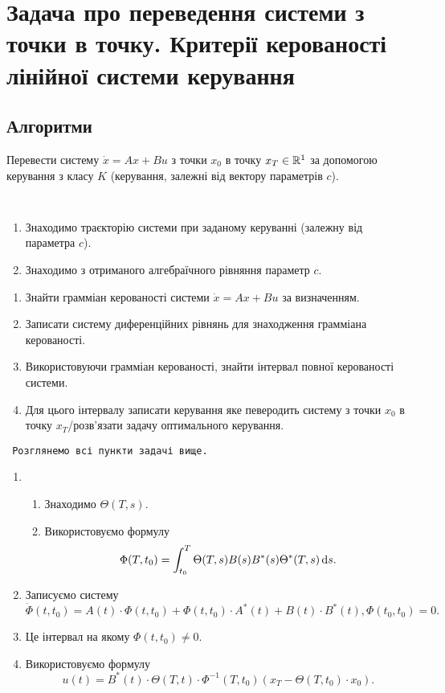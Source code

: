 \section{Задача про переведення системи з точки в точку. Критерії керованості лінійної системи керування}

\subsection{Алгоритми}

\begin{problem*}
	Перевести систему $\dot x = A x + B u$ з точки $x_0$ в точку $x_T \in \mathbb{R}^1$ за допомогою керування з класу $K$ (керування, залежні від вектору параметрів $c$).
\end{problem*}

\begin{algorithm} \tt
	\begin{enumerate}
		\item Знаходимо траєкторію системи при заданому керуванні (залежну від параметра $c$). 
		\item Знаходимо з отриманого алгебраїчного рівняння параметр $c$.
	\end{enumerate}
\end{algorithm}

\begin{problem*}
	\begin{enumerate}
		\item Знайти грамміан керованості системи $\dot x = A x + B u$ за визначенням.
		\item Записати систему диференційних рівнянь для знаходження грамміана керованості.
		\item Використовуючи грамміан керованості, знайти інтервал повної керованості системи.
		\item Для цього інтервалу записати керування яке певеродить систему з точки $x_0$ в точку $x_T$/розв'язати задачу оптимального керування.
	\end{enumerate}
\end{problem*}

\begin{algorithm} \tt
	Розглянемо всі пункти задачі вище.
	\begin{enumerate}
		\item \begin{enumerate}
			\item Знаходимо $\Theta(T,s)$.
			\item Використовуємо формулу \[\Phi(T, t_0) = \int_{t_0}^T \Theta(T, s) B(s) B^*(s) \Theta^*(T, s) \mathop{}\!\mathrm{d} s.\]
		\end{enumerate}
		\item Записуємо систему \[ \dot \Phi(t, t_0) = A(t) \cdot \Phi(t,t_0)+\Phi(t,t_0)\cdot A^*(t)+B(t)\cdot B^*(t), \Phi(t_0,t_0) = 0. \]
		\item Це інтервал на якому $\Phi(t,t_0) \ne 0$.
		\item Використовуємо формулу \[ u (t) = B^*(t) \cdot \Theta(T,t)\cdot\Phi^{-1}(T,t_0)(x_T-\Theta(T,t_0)\cdot x_0). \]
	\end{enumerate}
\end{algorithm}

